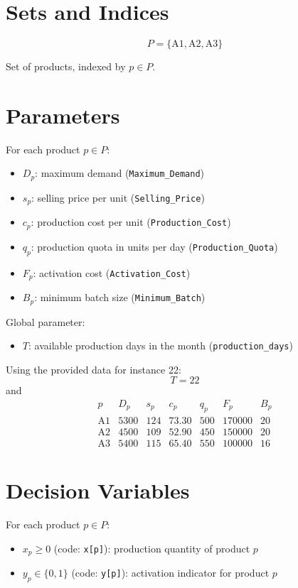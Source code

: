 \section*{Sets and Indices}

\[
P=\{\text{A1},\text{A2},\text{A3}\}
\]

Set of products, indexed by \(p \in P\).

\section*{Parameters}

For each product \(p \in P\):
\begin{itemize}
    \item \(D_p\): maximum demand (\texttt{Maximum\_Demand})
    \item \(s_p\): selling price per unit (\texttt{Selling\_Price})
    \item \(c_p\): production cost per unit (\texttt{Production\_Cost})
    \item \(q_p\): production quota in units per day (\texttt{Production\_Quota})
    \item \(F_p\): activation cost (\texttt{Activation\_Cost})
    \item \(B_p\): minimum batch size (\texttt{Minimum\_Batch})
\end{itemize}

Global parameter:
\begin{itemize}
    \item \(T\): available production days in the month (\texttt{production\_days})
\end{itemize}

Using the provided data for instance 22:
\[
T=22
\]
and
\[
\begin{array}{c|cccccc}
p & D_p & s_p & c_p & q_p & F_p & B_p \\
\hline
\text{A1} & 5300 & 124 & 73.30 & 500 & 170000 & 20 \\
\text{A2} & 4500 & 109 & 52.90 & 450 & 150000 & 20 \\
\text{A3} & 5400 & 115 & 65.40 & 550 & 100000 & 16
\end{array}
\]

\section*{Decision Variables}

For each product \(p \in P\):
\begin{itemize}
    \item \(x_p \ge 0\) (code: \texttt{x[p]}): production quantity of product \(p\)
    \item \(y_p \in \{0,1\}\) (code: \texttt{y[p]}): activation indicator for product \(p\)
\end{itemize}

